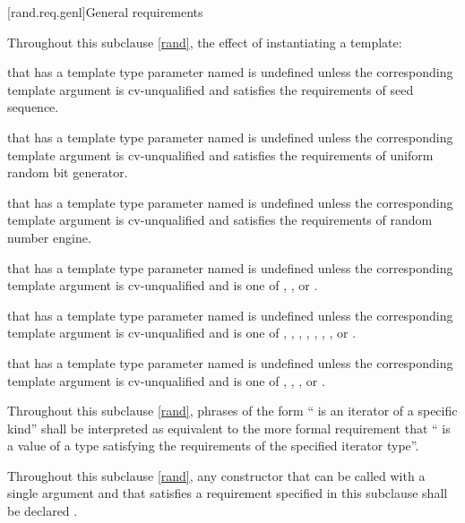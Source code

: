 [rand.req.genl]{General requirements}%

\pnum
Throughout this subclause \ref{rand},
the effect of instantiating a template:
\begin{enumeratea}
  \item
    that has a template type parameter
    named 
    is undefined unless the corresponding template argument
    is cv-unqualified and
    satisfies the requirements
    of seed sequence.
  \item
    that has a template type parameter
    named 
    is undefined unless the corresponding template argument
    is cv-unqualified and
    satisfies the requirements
    of uniform random bit generator.
  \item
    that has a template type parameter
    named 
    is undefined unless the corresponding template argument
    is cv-unqualified and
    satisfies the requirements
    of random number engine.
  \item
    that has a template type parameter
    named 
    is undefined unless the corresponding template argument
    is cv-unqualified and
    is one of
    , , or .
  \item
    that has a template type parameter
    named 
    is undefined unless the corresponding template argument
    is cv-unqualified and
    is one of
      ,
      ,
      ,
      ,
      ,
      ,
      ,
      or
      .
  \item
    that has a template type parameter
    named 
    is undefined unless the corresponding template argument
    is cv-unqualified and
    is one of
      ,
      ,
      ,
      or
      .
\end{enumeratea}

\pnum
Throughout this subclause \ref{rand},
phrases of the form `` is an iterator of a specific kind''
shall be interpreted as equivalent to the more formal requirement that
`` is a value
of a type satisfying the requirements
of the specified iterator type''.

\pnum
Throughout this subclause \ref{rand},
any constructor that can be called with a single argument
and that satisfies a requirement specified in this subclause
shall be declared .

